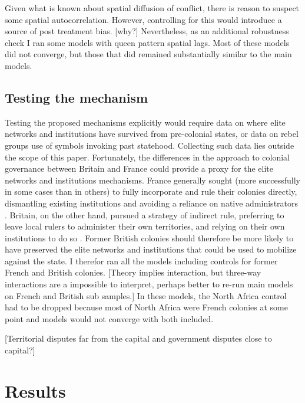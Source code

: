 \documentclass[12pt]{article}
\begin{document}
Given what is known about spatial diffusion of conflict, there is reason to
suspect some spatial autocorrelation. However, controlling for this would
introduce a source of post treatment bias. [why?] Nevertheless, as an additional
robustness check I ran some models with queen pattern spatial lags. Most of
these models did not converge, but those that did remained substantially similar
to the main models.

\subsection{Testing the mechanism} \label{Testing the mechanism}

Testing the proposed mechanisms explicitly would require data on where elite
networks and institutions have survived from pre-colonial states, or data on
rebel groups use of symbols invoking past statehood. Collecting such data lies
outside the scope of this paper. Fortunately, the differences in the approach to
colonial governance between Britain and France could provide a proxy for the
elite networks and institutions mechanisms. France generally sought (more
successfully in some cases than in others) to fully incorporate and rule their
colonies directly, dismantling existing institutions and avoiding a reliance on
native administrators \citep{Blanton_2001}. Britain, on the other hand, pursued
a strategy of indirect rule, preferring to leave local rulers to administer
their own territories, and relying on their own institutions to do so
\citep{Blanton_2001}. Former British colonies should therefore be more likely to
have preserved the elite networks and institutions that could be used to
mobilize against the state. I therefor ran all the models including controls for
former French and British colonies. [Theory implies interaction, but three-way
interactions are a impossible to interpret, perhaps better to re-run main models
on French and British sub samples.] In these models, the North Africa control had
to be dropped because most of North Africa were French colonies at some point
and models would not converge with both included. 

[Territorial disputes far from the capital and government disputes close to
capital?]

\section{Results} \label{Results}
\end{document}
